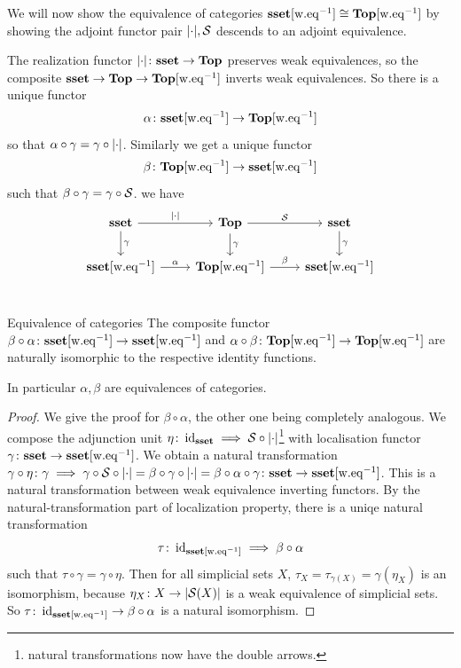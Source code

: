 \documentclass[language=english]{TemplateLecture}
\begin{document}
We will now show the equivalence of categories \(\mathbf{sset}[\mathrm{w.eq}^{-1}] \cong \mathbf{Top}[\mathrm{w.eq}^{-1}]\) by showing the adjoint functor pair \(\lvert\cdot\rvert, \mathcal{S}\) descends to an adjoint equivalence.

The realization functor \(\lvert\cdot\rvert\colon \mathbf{sset} \to \mathbf{Top}\) preserves weak equivalences, so the composite \(\mathbf{sset} \to \mathbf{Top} \to \mathbf{Top}[\mathrm{w.eq}^{-1}]\) inverts weak equivalences. So there is a unique functor
\[\alpha\colon \mathbf{sset}[\mathrm{w.eq}^{-1}] \to \mathbf{Top}[\mathrm{w.eq}^{-1}]\]
so that \(\alpha\circ \gamma = \gamma\circ \lvert\cdot\rvert\). Similarly we get a unique functor
\[\beta\colon \mathbf{Top} [\mathrm{w.eq}^{-1}] \to \mathbf{sset}[\mathrm{w.eq}^{-1}]\]
such that \(\beta\circ \gamma = \gamma\circ \mathcal{S}\). we have
\[\begin{tikzcd}
    \sset \ar[r, "\abs\cdot"] \ar[d, "\gamma"] & \topc \ar[d, "\gamma"] \ar[r, "\cS"] & \sset \ar[d, "\gamma"] \\
    \sset\weq \ar[r, "\alpha"] & \topc\weq \ar[r, "\beta"] & \sset\weq \\
\end{tikzcd}\]

\begin{thm}{Equivalence of categories}{}
    The composite functor \(\beta\circ \alpha \colon \mathbf{sset}[\mathrm{w.eq}^{-1}] \to \mathbf{sset}[\mathrm{w.eq}^{-1}]\) and \(\alpha\circ \beta\colon \mathbf{Top}[\mathrm{w.eq}^{-1}] \to \mathbf{Top}[\mathrm{w.eq}^{-1}]\) are naturally isomorphic to the respective identity functions.

    In particular \(\alpha, \beta\) are equivalences of categories.
\end{thm}

\begin{proof}
    We give the proof for \(\beta\circ \alpha\), the other one being completely analogous. We compose the adjunction unit \(\eta\colon \operatorname{id}_{\mathbf{sset}}\implies \mathcal{S}\circ \lvert\cdot\rvert\)\footnote{natural transformations now have the double arrows.} with localisation functor \(\gamma\colon \mathbf{sset} \to \mathbf{sset}[\mathrm{w.eq}^{-1}]\). We obtain a natural transformation \(\gamma\circ \eta\colon \gamma \implies \gamma\circ \mathcal{S}\circ \lvert\cdot\rvert = \beta\circ \gamma \circ \lvert\cdot\rvert = \beta\circ \alpha\circ \gamma\colon \mathbf{sset} \to \mathbf{sset}[\mathrm{w.eq}^{-1}]\).
    This is a natural transformation between weak equivalence inverting functors. By the natural-transformation part of localization property, there is a uniqe natural transformation
    \[\tau\colon \operatorname{id}_{\mathbf{sset}[\mathrm{w.eq}^{-1}]}\implies \beta\circ \alpha\]
    such that \(\tau\circ \gamma = \gamma\circ \eta\). Then for all simplicial sets \(X\), \(\tau_X = \tau_{\gamma(X)} = \gamma(\eta_X)\) is an isomorphism, because \(\eta_X\colon X \to \lvert\mathcal{S}(X)\rvert\) is a weak equivalence of simplicial sets. So \(\tau\colon \operatorname{id}_{\mathbf{sset}[\mathrm{w.eq}^{-1}]} \to \beta\circ \alpha\) is a natural isomorphism.
\end{proof}
\end{document}
